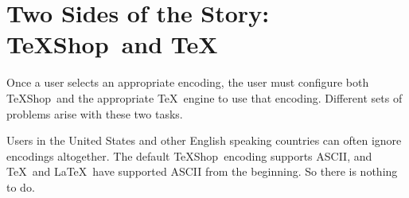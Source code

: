 \documentclass[letterpaper,11pt]{article}
\newcommand{\TS}{\textsf{\TeX Shop}}
\newcommand{\acr}[1]{\textsf{#1}}
\newcommand{\cmd}[1]{\textsf{#1}}
\begin{document}
%

%

\section{Two Sides of the Story: \TS\ and \TeX}

Once a user selects an appropriate encoding, the user must configure both \TS\ and
the appropriate \TeX\ engine to use that encoding. Different sets of problems arise with these
two tasks. 


Users in the United States and other English speaking countries can often ignore encodings
altogether. The default \TS\ encoding supports \acr{ASCII}, and \TeX\ and \LaTeX\ have supported \acr{ASCII} from the beginning. So there is nothing to do.
\end{document}
